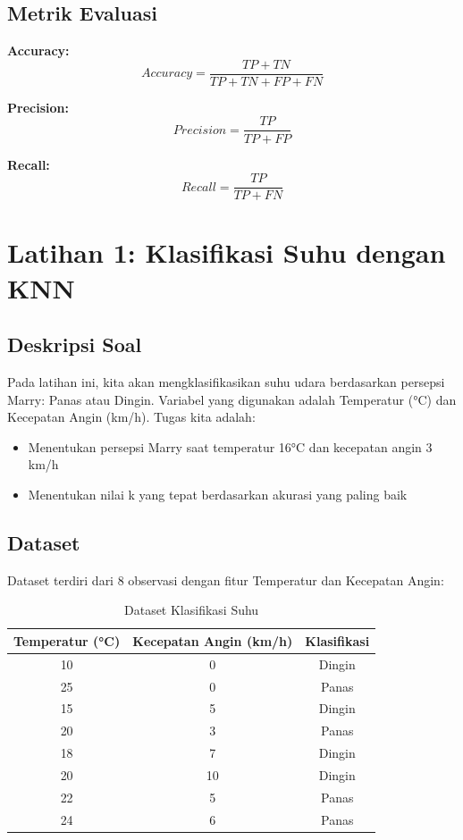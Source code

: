 \documentclass[12pt,a4paper]{article}
\begin{document}
\subsection{Metrik Evaluasi}

\textbf{Accuracy:}
\begin{equation}
Accuracy = \frac{TP + TN}{TP + TN + FP + FN}
\end{equation}

\textbf{Precision:}
\begin{equation}
Precision = \frac{TP}{TP + FP}
\end{equation}

\textbf{Recall:}
\begin{equation}
Recall = \frac{TP}{TP + FN}
\end{equation}

\section{Latihan 1: Klasifikasi Suhu dengan KNN}

\subsection{Deskripsi Soal}
Pada latihan ini, kita akan mengklasifikasikan suhu udara berdasarkan persepsi Marry: Panas atau Dingin. Variabel yang digunakan adalah Temperatur (°C) dan Kecepatan Angin (km/h). Tugas kita adalah:
\begin{itemize}
    \item Menentukan persepsi Marry saat temperatur 16°C dan kecepatan angin 3 km/h
    \item Menentukan nilai k yang tepat berdasarkan akurasi yang paling baik
\end{itemize}

\subsection{Dataset}
Dataset terdiri dari 8 observasi dengan fitur Temperatur dan Kecepatan Angin:

\begin{table}[H]
\centering
\caption{Dataset Klasifikasi Suhu}
\begin{tabular}{|c|c|c|}
\hline
\textbf{Temperatur (°C)} & \textbf{Kecepatan Angin (km/h)} & \textbf{Klasifikasi} \\
\hline
10 & 0 & Dingin \\
25 & 0 & Panas \\
15 & 5 & Dingin \\
20 & 3 & Panas \\
18 & 7 & Dingin \\
20 & 10 & Dingin \\
22 & 5 & Panas \\
24 & 6 & Panas \\
\hline
\end{tabular}
\end{table}
\end{document}
